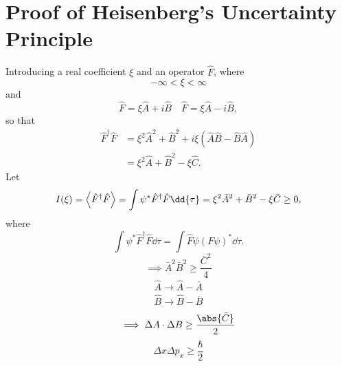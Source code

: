 
\section{Proof of Heisenberg's Uncertainty Principle}

Introducing a real coefficient \(\xi\) and an operator \(\hat{F}\), where
\begin{equation}
  -\infty < \xi < \infty
\end{equation}
and
\begin{equation}
  \hat{F} = \xi \hat{A} + i \hat{B} \quad  \hat{F} = \xi \hat{A} - i \hat{B},
\end{equation}
so that
\begin{equation}
  \begin{aligned}
    \hat{F}^\dagger  \hat{F} &= \xi^2 \hat{A}^2 + \hat{B}^2 + i \xi (\hat{A} \hat{B} - \hat{B} \hat{A}) \\
                             &= \xi^2 \hat{A} + \hat{B}^2 - \xi \hat{C}.
  \end{aligned}
\end{equation}
Let
\begin{equation}
  I(\xi) = \Braket{ \hat{F}^\dagger \hat{F} }  = \int \psi^* \hat{F}^\dagger \hat{F} \dd{\tau} = \xi^2 \bar{A}^2 + \bar{B}^2 - \xi \bar{C} \geq 0,
\end{equation}
where
\begin{equation}
  \int \psi^* \hat{F}^\dagger \hat{F} \dd{\tau} = \int \hat{F} \psi ( F \psi )^* \dd{\tau}.
\end{equation}
\begin{equation}
  \implies \bar{A}^2 \bar{B}^2 \geq  \frac{\bar{C}^2}{4}
\end{equation}
\begin{align}
  \hat{A} \rightarrow \hat{A} - \bar{A} \\
  \hat{B} \rightarrow \hat{B} - \bar{B}
\end{align}
\begin{equation}
  \implies \Delta A \cdot \Delta B \geq \frac{\abs{\bar{C}}}{2}
\end{equation}
\begin{equation}
  \Delta x \Delta p_x \geq \frac{\hbar}{2}
\end{equation}



